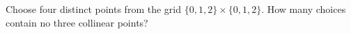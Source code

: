 Choose four distinct points from the grid $\{0,1,2\}\times\{0,1,2\}$. How many choices contain no three collinear points?
